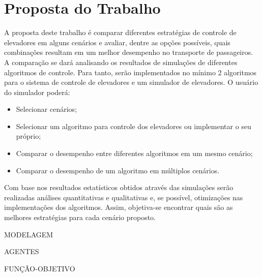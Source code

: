 \chapter{\label{chap:proposal}Proposta do Trabalho}

{\color{red}A proposta deste trabalho é comparar diferentes estratégias de controle de elevadores em alguns cenários e avaliar, dentre as opções possíveis, quais combinações resultam em um melhor desempenho no transporte de passageiros. A comparação se dará analisando os resultados de simulações de diferentes algoritmos de controle. Para tanto, serão implementados no mínimo 2 algoritmos para o sistema de controle de elevadores e um simulador de elevadores. O usuário do simulador poderá:

\begin{itemize}
  \item Selecionar cenários;
  \item Selecionar um algoritmo para controle dos elevadores ou implementar o seu próprio;
  \item Comparar o desempenho entre diferentes algoritmos em um mesmo cenário;
  \item Comparar o desempenho de um algoritmo em múltiplos cenários.
\end{itemize}

Com base nos resultados estatísticos obtidos através das simulações serão realizadas análises quantitativas e qualitativas e, se possível, otimizações nas implementações dos algoritmos. Assim, objetiva-se encontrar quais são as melhores estratégias para cada cenário proposto.}

MODELAGEM

AGENTES

FUNÇÃO-OBJETIVO